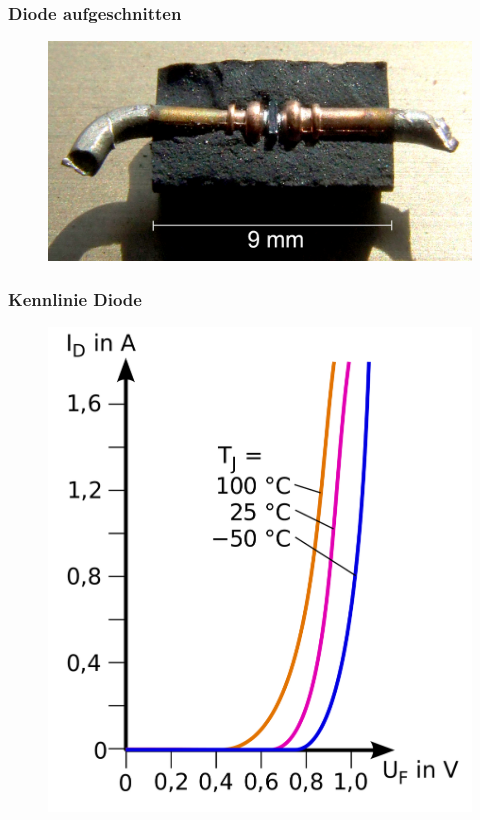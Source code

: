 \begin{frame}
  \frametitle{Diode aufgeschnitten}
  \begin{center}
    \begin{figure}
      \includegraphics[width=.9\textwidth,height=.75\textheight,keepaspectratio]{e12/Schottky_Diode_Section.jpg}
    \end{figure}
  \end{center}
\end{frame}

\begin{frame}
  \frametitle{Kennlinie Diode}
  \begin{center}
    \begin{figure}
      \includegraphics[height=.75\textheight,width=\textwidth,keepaspectratio]{e12/Kennlinie_1N4001.png}
    \end{figure}
  \end{center}
\end{frame}

